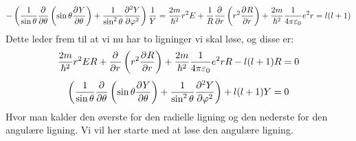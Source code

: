 \documentclass[../../Atom-ogMolekylefysik.tex]{subfiles}
\begin{document}
\begin{equation}
    -\left(\frac{1}{\sin\theta}\pdif{\theta}{}\left(\sin \theta\pdif{\theta}{Y}\right)+\frac{1}{\sin^2\theta}\pdif[2]{\phi}{Y}\right)\frac{1}{Y}=\frac{2m}{\hbar^2}r^{2}E+\frac{1}{R}\pdif{r}{}\left(r^2\pdif{r}{R}\right)+\frac{2m}{\hbar^2}\frac{1}{4\pi\epsilon_{0}}e^2r=l(l+1)
\end{equation}
Dette leder frem til at vi nu har to ligninger vi skal løse, og disse er:
\begin{equation}
    \frac{2m}{\hbar^2}r^{2}ER+\pdif{r}{}\left(r^2\pdif{r}{R}\right)+\frac{2m}{\hbar^2}\frac{1}{4\pi\epsilon_{0}}e^2rR-l(l+1)R=0
    \label{eq:amo:radial}
\end{equation}
\begin{equation}
    \left(\frac{1}{\sin\theta}\pdif{\theta}{}\left(\sin \theta\pdif{\theta}{Y}\right)+\frac{1}{\sin^2\theta}\pdif[2]{\phi}{Y}\right)+l(l+1)Y=0
\end{equation}
Hvor man kalder den øverste for den radielle ligning og den nederste for den angulære ligning. Vi vil her starte med at løse den angulære ligning.
\end{document}

